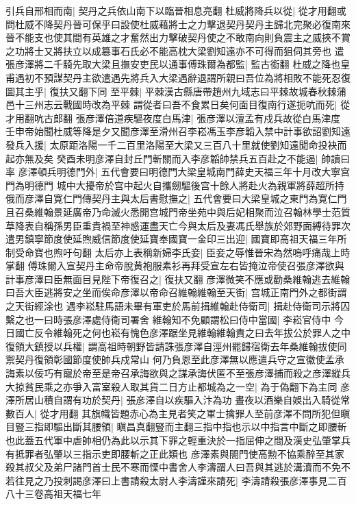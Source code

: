 引兵自邢相而南|{
	契丹之兵依山南下以臨晉相息亮翻}
杜威將降兵以從|{
	從才用翻或問杜威不降契丹晉可保乎曰設使杜威藉將士之力擊退契丹契丹主歸北完聚必復南來晉不能支也使其間有英雄之才奮然出力擊破契丹使之不敢南向則負震主之威挾不賞之功將士又將扶立以成簒事石氏必不能高枕大梁劉知遠亦不可得而狙伺其旁也}
遣張彦澤將二千騎先取大梁且撫安吏民以通事傅珠爾為都監|{
	監古銜翻}
杜威之降也皇甫遇初不預謀契丹主欲遣遇先將兵入大梁遇辭退謂所親曰吾位為將相敗不能死忍復圖其主乎|{
	復扶又翻下同}
至平棘|{
	平棘漢古縣唐帶趙州九域志曰平棘故城春秋棘蒲邑十三州志云戰國時改為平棘}
謂從者曰吾不食累日矣何面目復南行遂扼吭而死|{
	從才用翻吭古郎翻}
張彦澤倍道疾驅夜度白馬津|{
	張彦澤以澶孟有戍兵故從白馬津度}
壬申帝始聞杜威等降是夕又聞彦澤至滑州召李崧馮玉李彦韜入禁中計事欲詔劉知遠發兵入援|{
	太原距洛陽一千二百里洛陽至大梁又三百八十里就使劉知遠聞命投袂而起亦無及矣}
癸酉未明彦澤自封丘門斬關而入李彦韜帥禁兵五百赴之不能遏|{
	帥讀曰率}
彦澤頓兵明德門外|{
	五代會要曰明德門大梁皇城南門薛史天福三年十月改大寧宫門為明德門}
城中大擾帝於宫中起火自攜劒驅後宫十餘人將赴火為親軍將薛超所持俄而彦澤自寛仁門傳契丹主與太后書慰撫之|{
	五代會要曰大梁皇城之東門為寛仁門}
且召桑維翰景延廣帝乃命滅火悉開宫城門帝坐苑中與后妃相聚而泣召翰林學士范質草降表自稱孫男臣重貴禍至神惑運盡天亡今與太后及妻馮氏舉族於郊野面縛待罪次遣男鎮寧節度使延煦威信節度使延寶奉國寶一金印三出迎|{
	國寶即高祖天福三年所制受命寶也煦吁句翻}
太后亦上表稱新婦李氏妾|{
	臣妾之辱惟晉宋為然嗚呼痛哉上時掌翻}
傅珠爾入宣契丹主命帝脫黄袍服素衫再拜受宣左右皆掩泣帝使召張彦澤欲與計事彦澤曰臣無面目見陛下帝復召之|{
	復扶又翻}
彦澤微笑不應或勸桑維翰逃去維翰曰吾大臣逃將安之坐而俟命彦澤以帝命召維翰維翰至天街|{
	宫城正南門外之都街謂之天街經涂也}
遇李崧駐馬語未畢有軍吏於馬前揖維翰赴侍衛司|{
	揖赴侍衛司示將囚繫之也一曰時張彦澤處侍衛司署舍}
維翰知不免顧謂松曰侍中當國|{
	李崧官侍中}
今日國亡反令維翰死之何也崧有愧色彦澤踞坐見維翰維翰責之曰去年拔公於罪人之中復領大鎮授以兵權|{
	謂高祖時朝野皆請誅張彦澤自涇州罷歸宿衛去年桑維翰拔使同禦契丹復領彰國節度使帥兵戍常山}
何乃負恩至此彦澤無以應遣兵守之宣徽使孟承誨素以佞巧有寵於帝至是帝召承誨欲與之謀承誨伏匿不至張彦澤捕而殺之彦澤縱兵大掠貧民乘之亦爭入富室殺人取其貨二日方止都城為之一空|{
	為于偽翻下為主同}
彦澤所居山積自謂有功於契丹|{
	張彦澤自以疾驅入汴為功}
晝夜以酒樂自娛出入騎從常數百人|{
	從才用翻}
其旗幟皆題赤心為主見者笑之軍士擒罪人至前彦澤不問所犯但瞋目豎三指即驅出斷其腰領|{
	瞋昌真翻豎而主翻三指中指也示以中指言中斷之即腰斬也此蓋五代軍中虐帥相仍為此以示其下罪之輕重決於一指屈伸之間及漢史弘肇掌兵有抵罪者弘肇以三指示吏即腰斬之正此類也}
彦澤素與閤門使高勲不協乘醉至其家殺其叔父及弟尸諸門首士民不寒而慄中書舍人李濤謂人曰吾與其逃於溝瀆而不免不若往見之乃投刺謁彦澤曰上書請殺太尉人李濤謹來請死|{
	李濤請殺張彦澤事見二百八十三卷高祖天福七年}
